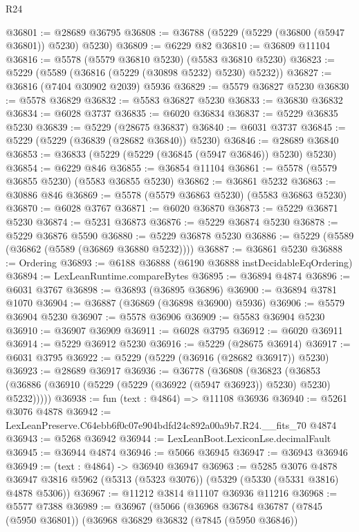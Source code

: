 \begin{lexlean}{R24}
\begin{coremodule}
@36801 := @28689 @36795
@36808 := @36788 (@5229 (@5229 (@36800 (@5947 @36801)) @5230) @5230)
@36809 := @6229 @82
@36810 := @36809 @11104
@36816 := @5578 (@5579 @36810 @5230) (@5583 @36810 @5230)
@36823 := @5229 (@5589 (@36816 (@5229 (@30898 @5232) @5230) @5232))
@36827 := @36816 (@7404 @30902 @2039) @5936
@36829 := @5579 @36827 @5230
@36830 := @5578 @36829
@36832 := @5583 @36827 @5230
@36833 := @36830 @36832
@36834 := @6028 @3737
@36835 := @6020 @36834
@36837 := @5229 @36835 @5230
@36839 := @5229 (@28675 @36837)
@36840 := @6031 @3737
@36845 := @5229 (@5229 (@36839 (@28682 @36840)) @5230)
@36846 := @28689 @36840
@36853 := @36833 (@5229 (@5229 (@36845 (@5947 @36846)) @5230) @5230)
@36854 := @6229 @846
@36855 := @36854 @11104
@36861 := @5578 (@5579 @36855 @5230) (@5583 @36855 @5230)
@36862 := @36861 @5232
@36863 := @30886 @846
@36869 := @5578 (@5579 @36863 @5230) (@5583 @36863 @5230)
@36870 := @6028 @3767
@36871 := @6020 @36870
@36873 := @5229 @36871 @5230
@36874 := @5231 @36873
@36876 := @5229 @36874 @5230
@36878 := @5229 @36876 @5590
@36880 := @5229 @36878 @5230
@36886 := @5229 (@5589 (@36862 (@5589 (@36869 @36880 @5232))))
@36887 := @36861 @5230
@36888 := Ordering
@36893 := @6188 @36888 (@6190 @36888 instDecidableEqOrdering)
@36894 := LexLeanRuntime.compareBytes
@36895 := @36894 @4874
@36896 := @6031 @3767
@36898 := @36893 (@36895 @36896)
@36900 := @36894 @3781 @1070
@36904 := @36887 (@36869 (@36898 @36900) @5936)
@36906 := @5579 @36904 @5230
@36907 := @5578 @36906
@36909 := @5583 @36904 @5230
@36910 := @36907 @36909
@36911 := @6028 @3795
@36912 := @6020 @36911
@36914 := @5229 @36912 @5230
@36916 := @5229 (@28675 @36914)
@36917 := @6031 @3795
@36922 := @5229 (@5229 (@36916 (@28682 @36917)) @5230)
@36923 := @28689 @36917
@36936 := @36778
    (@36808
      (@36823 (@36853 (@36886 (@36910 (@5229 (@5229 (@36922 (@5947 @36923)) @5230) @5230) @5232)))))
@36938 := fun (text : @4864) => @11108 @36936
@36940 := @5261 @3076 @4878
@36942 := LexLeanPreserve.C64ebb6f0c07e904bdfd24c892a00a9b7.R24.__fits_70 @4874
@36943 := @5268 @36942
@36944 := LexLeanBoot.LexiconLse.decimalFault
@36945 := @36944 @4874
@36946 := @5066 @36945
@36947 := @36943 @36946
@36949 := (text : @4864) -> @36940 @36947
@36963 := @5285
    @3076
    @4878
    @36947
    @3816
    @5962
    (@5313 (@5323 @3076))
    (@5329 (@5330 (@5331 @3816) @4878 @5306))
@36967 := @11212 @3814 @11107 @36936 @11216
@36968 := @5577 @7388
@36989 := @36967
    (@5066
      (@36968
        @36784
        @36787
        (@7845 (@5950 @36801))
        (@36968
          @36829
          @36832
          (@7845 (@5950 @36846))

\end{coremodule}
\end{lexlean}
